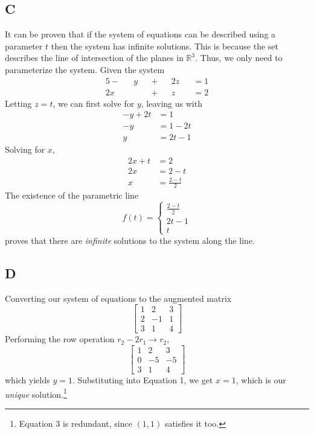 \documentclass[]{article}
\begin{document}
\subsection{C}

It can be proven that if the system of equations can be described using a parameter \(t\) then the system has infinite solutions. This is because the set describes the line of intersection of the planes in \(\mathbb{R}^3\). Thus, we only need to parameterize the system. Given the system
\begin{alignat}{5}
	- && y && + && 2z && = 1 \\
	2x && && + && z && =2
\end{alignat}
Letting \(z = t\), we can first solve for \(y\), leaving us with 
\begin{align}
	-y + 2t &= 1 \\
	-y &= 1 - 2t \\
	y &= 2t - 1
\end{align}
Solving for \(x\),
\begin{align}
	2x + t &= 2 \\
	2x &= 2 - t \\
	x &= \frac{2 - t}{2}
\end{align}
The existence of the parametric line
\begin{equation}
	f(t) = 
	\begin{cases}
	\frac{2 - t}{2} \\
	2t - 1 \\
	t
	\end{cases}
\end{equation}
proves that there are \emph{infinite} solutions to the system along the line. 

\subsection{D}

Converting our system of equations to the augmented matrix
\begin{equation}
	\left[
	\begin{array}{cc|c}
	1 & 2 & 3 \\
	2 & -1 & 1 \\
	3 & 1 & 4
	\end{array}
	\right]
\end{equation}
Performing the row operation \(r_2 - 2r_1 \to r_2\),
\begin{equation}
	\left[
	\begin{array}{cc|c}
	1 & 2 & 3 \\
	0 & -5 & -5 \\
	3 & 1 & 4
	\end{array}
	\right]
\end{equation}
which yields \(\boxed{y = 1}\). Substituting into Equation 1, we get \(\boxed{x = 1}\), which is our \emph{unique} solution.\footnote{Equation 3 is redundant, since \((1,1)\) satisfies it too.}
\end{document}
